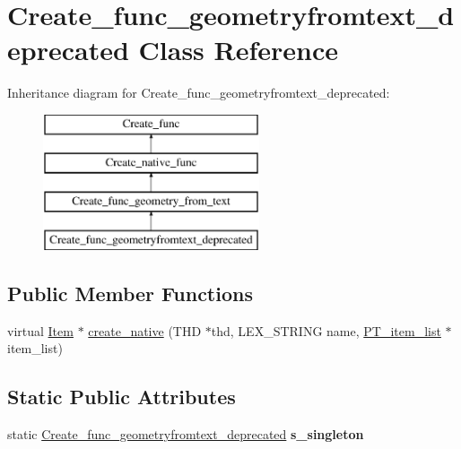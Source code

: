 \hypertarget{classCreate__func__geometryfromtext__deprecated}{}\section{Create\+\_\+func\+\_\+geometryfromtext\+\_\+deprecated Class Reference}
\label{classCreate__func__geometryfromtext__deprecated}
Inheritance diagram for Create\+\_\+func\+\_\+geometryfromtext\+\_\+deprecated\+:\begin{figure}[H]
\begin{center}
\leavevmode
\includegraphics[height=4.000000cm]{classCreate__func__geometryfromtext__deprecated}
\end{center}
\end{figure}
\subsection*{Public Member Functions}
\begin{DoxyCompactItemize}
\item 
virtual \mbox{\hyperlink{classItem}{Item}} $\ast$ \mbox{\hyperlink{classCreate__func__geometryfromtext__deprecated_ad8af1636a8592df47f1608e873a26929}{create\+\_\+native}} (T\+HD $\ast$thd, L\+E\+X\+\_\+\+S\+T\+R\+I\+NG name, \mbox{\hyperlink{classPT__item__list}{P\+T\+\_\+item\+\_\+list}} $\ast$item\+\_\+list)
\end{DoxyCompactItemize}
\subsection*{Static Public Attributes}
\begin{DoxyCompactItemize}
\item 
\mbox{\label{classCreate__func__geometryfromtext__deprecated_a33a5ea92c4b55b3e1f385f9ae6b6af96}} 
static \mbox{\hyperlink{classCreate__func__geometryfromtext__deprecated}{Create\+\_\+func\+\_\+geometryfromtext\+\_\+deprecated}} {\bfseries s\+\_\+singleton}
\end{DoxyCompactItemize}
